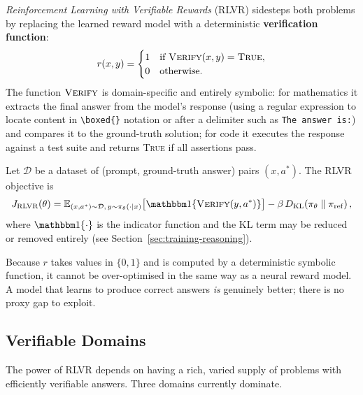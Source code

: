 \emph{Reinforcement Learning with Verifiable Rewards} (RLVR) sidesteps
both problems by replacing the learned reward model with a deterministic
\textbf{verification function}:
\begin{equation}
\label{eq:rlvr-reward}
r(x, y) = \begin{cases}
  1 & \text{if } \textsc{Verify}(x, y) = \textsc{True}, \\
  0 & \text{otherwise.}
\end{cases}
\end{equation}
The function $\textsc{Verify}$ is domain-specific and entirely
symbolic: for mathematics it extracts the final answer from the
model's response (using a regular expression to locate content in
\texttt{\textbackslash boxed\{\}} notation or after a delimiter such
as \texttt{The answer is:}) and compares it to the ground-truth
solution; for code it executes the response against a test suite and
returns \textsc{True} if all assertions pass.

\begin{definition}
\label{def:rlvr}
Let $\mathcal{D}$ be a dataset of (prompt, ground-truth answer) pairs
$(x, a^*)$. The RLVR objective is
\begin{equation}
\label{eq:rlvr-objective}
J_{\mathrm{RLVR}}(\theta)
  = \E_{(x,a^*)\sim\mathcal{D},\,y\sim\pi_\theta(\cdot|x)}
    \bigl[\ind\{\textsc{Verify}(y, a^*)\}\bigr]
  - \beta\,\KL{\pi_\theta}{\pi_{\mathrm{ref}}},
\end{equation}
where $\ind\{\cdot\}$ is the indicator function and the KL term may
be reduced or removed entirely (see Section~\ref{sec:training-reasoning}).
\end{definition}

Because $r$ takes values in $\{0, 1\}$ and is computed by a
deterministic symbolic function, it cannot be over-optimised in the
same way as a neural reward model. A model that learns to produce
correct answers \emph{is} genuinely better; there is no proxy gap to
exploit.

\subsection{Verifiable Domains}
\label{subsec:verifiable-domains}

The power of RLVR depends on having a rich, varied supply of problems
with efficiently verifiable answers. Three domains currently dominate.

